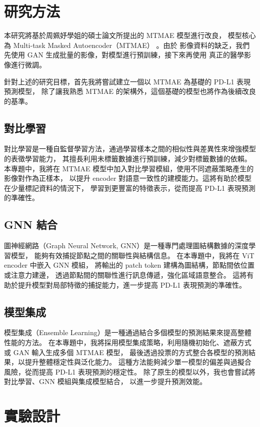 \documentclass[12pt,a4paper]{article}
\begin{document}
\section{研究方法}
本研究將基於周姵妤學姐的碩士論文所提出的 MTMAE 模型進行改良，
模型核心為 Multi-task Masked Autoencoder（MTMAE） 。由於
影像資料的缺乏，我們先使用 GAΝ 生成批量的影像，對模型進行預訓練，接下來再使用
真正的醫學影像進行微調。

針對上述的研究目標，首先我將嘗試建立一個以 MTMAE 為基礎的 PD-L1 表現預測模型，
除了讓我熟悉 MTMAE 的架構外，這個基礎的模型也將作為後續改良的基準。

\subsection{對比學習}
對比學習是一種自監督學習方法，通過學習樣本之間的相似性與差異性來增強模型的表徵學習能力，
其擅長利用未標籤數據進行預訓練，減少對標籤數據的依賴。
本專題中，我將在 MTMAE 模型中加入對比學習模組，使用不同遮蔽策略產生的影像對作為正樣本，
以提升 encoder 對語意一致性的建模能力。這將有助於模型在少量標記資料的情況下，
學習到更豐富的特徵表示，從而提高 PD-L1 表現預測的準確性。

\subsection{GNN 結合}
圖神經網路（Graph Neural Network, GNN）是一種專門處理圖結構數據的深度學習模型，
能夠有效捕捉節點之間的關聯性與結構信息。
在本專題中，我將在 ViT encoder 中嵌入 GNN 模組，
將輸出的 patch token 建構為圖結構，節點間依位置或注意力建邊，
透過節點間的關聯性進行訊息傳遞，強化區域語意整合。
這將有助於提升模型對局部特徵的捕捉能力，進一步提高 PD-L1 表現預測的準確性。

\subsection{模型集成}
模型集成（Ensemble Learning）是一種通過結合多個模型的預測結果來提高整體性能的方法。
在本專題中，我將採用模型集成策略，利用隨機初始化、遮蔽方式或 GAN 輸入生成多個 MTMAE 模型，
最後透過投票的方式整合各模型的預測結果，以提升整體穩定性與泛化能力。
這種方法能夠減少單一模型的偏差與過擬合風險，從而提高 PD-L1 表現預測的穩定性。
除了原生的模型以外，我也會嘗試將對比學習、GNN 模組與集成模型結合，
以進一步提升預測效能。

\section{實驗設計}
\end{document}
